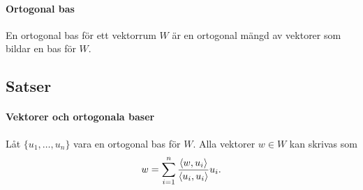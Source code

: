 \paragraph{Ortogonal bas}
En ortogonal bas för ett vektorrum $W$ är en ortogonal mängd av vektorer som bildar en bas för $W$.

\subsection{Satser}

\paragraph{Vektorer och ortogonala baser}
Låt $\{u_1, \dots, u_n\}$ vara en ortogonal bas för $W$. Alla vektorer $w\in W$ kan skrivas som
\begin{align*}
	w = \sum\limits_{i = 1}^n \frac{\expval{w, u_i}}{\expval{u_i, u_i}}u_i.
\end{align*}

\proof